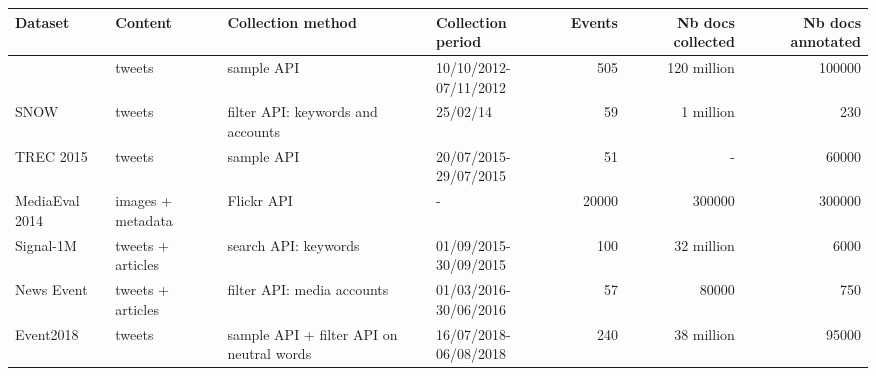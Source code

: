 \begin{tabular}{llllrrr}
\hline
                                \textbf{Dataset} &            \textbf{Content} &                         \textbf{Collection method} &      \textbf{Collection period} &  \textbf{Events} & \textbf{Nb docs collected} &  \textbf{Nb docs annotated} \\
\hline
           \citet{mcminn_building_2013} &             tweets &                                sample API &  10/10/2012-07/11/2012 &     505 &       120 million &             100000 \\
     SNOW \cite{papadopoulos_snow_2014} &             tweets &         filter API: keywords and accounts &               25/02/14 &      59 &         1 million &                230 \\
       TREC 2015 \cite{lin2015overview} &             tweets &                                sample API &  20/07/2015-29/07/2015 &      51 &                 - &              60000 \\
 MediaEval 2014 \cite{petkos2014social} &  images + metadata &                                Flickr API &                      - &   20000 &            300000 &             300000 \\
        Signal-1M \cite{suarez2018data} &  tweets + articles &                      search API: keywords &  01/09/2015-30/09/2015 &     100 &        32 million &               6000 \\
        News Event \cite{mele2019multi} &  tweets + articles &                filter API: media accounts &  01/03/2016-30/06/2016 &      57 &             80000 &                750 \\
     Event2018 \cite{mazoyer2020french} &             tweets &  sample API + filter API on neutral words &  16/07/2018-06/08/2018 &     240 &        38 million &              95000 \\
\hline
\end{tabular}
